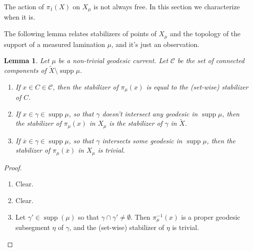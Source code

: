 \documentclass[12pt,article]{amsart}
\numberwithin{equation}{section}
\numberwithin{figure}{section}
\newtheorem{lemma}[equation]{Lemma}
\theoremstyle{definition}
\theoremstyle{plain}
\newcommand*{\wt}[1]{\widetilde{#1}}
\DeclareMathOperator{\supp}{supp}
\begin{document}
The action of $\pi_1(X)$ on $X_{\mu}$ is not always free. In this section we characterize when it is.

The following lemma relates stabilizers of points of $X_{\mu}$ and the topology of the support of a measured lamination $\mu$, and it's just an observation.

\begin{lemma}
Let $\mu$ be a non-trivial geodesic current.
Let $\mathcal{C}$ be the set of connected components of $\wt{X} \setminus \supp \mu$.
\begin{enumerate}
\item If $x \in C \in \mathcal{C}$, then the stabilizer of $\pi_\mu (x)$ is equal to the (set-wise) stabilizer of $C$.
\item If $x \in \gamma \in \supp \mu$, so that $\gamma$ doesn't intersect any geodesic in $\supp \mu$, then the stabilizer of $\pi_\mu (x)$ in $X_{\mu}$ is the stabilizer of $\gamma$ in $\wt{X}$.
\item If $\overline{x} \in \gamma \in \supp \mu$, so that $\gamma$ intersects some geodesic in $\supp \mu$, then the stabilizer of $\pi_{\mu} (\overline{x})$ in $X_{\mu}$ is trivial.
\end{enumerate}
\label{lem:dualstab}
\end{lemma}
\begin{proof}
\begin{enumerate}
\item Clear.
\item Clear.
\item Let $\gamma' \in \supp(\mu)$ so that $\gamma \cap \gamma' \neq \emptyset$.
 Then $\pi_{\mu}^{-1}(x)$ is a proper geodesic subsegment $\eta$ of $\gamma$, and the (set-wise) stabilizer of $\eta$ is trivial. 
\end{enumerate}
\end{proof}
\end{document}
